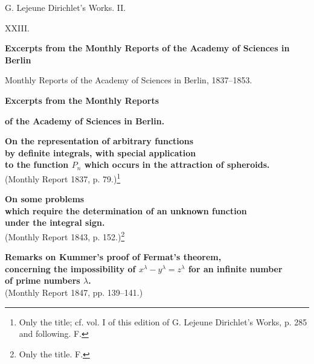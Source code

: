 \documentclass[11pt]{article}
\begin{document}
\begin{center}
{\Large G. Lejeune Dirichlet's Works. II.}\par\vspace{1.2em}
{\Large XXIII.}\par\vspace{0.5em}
{\LARGE \textbf{Excerpts from the Monthly Reports of the Academy of Sciences in Berlin}}\par\vspace{1em}
{\small Monthly Reports of the Academy of Sciences in Berlin, 1837--1853.}
\end{center}

\bigskip
\begin{center}
{\Large \textbf{Excerpts from the Monthly Reports}}\par
{\Large \textbf{of the Academy of Sciences in Berlin.}}
\end{center}

\bigskip
\begin{center}
{\large \textbf{On the representation of arbitrary functions}}\\
{\large \textbf{by definite integrals, with special application}}\\
{\large \textbf{to the function $P_n$ which occurs in the attraction of spheroids.}}\\
{\small (Monthly Report 1837, p. 79.)\footnote{Only the title; cf. vol. I of this edition of G. Lejeune Dirichlet's Works, p. 285 and following. \textnormal{F.}}}
\end{center}

\vspace{2em}
\begin{center}
{\large \textbf{On some problems}}\\
{\large \textbf{which require the determination of an unknown function}}\\
{\large \textbf{under the integral sign.}}\\
{\small (Monthly Report 1843, p. 152.)\footnote{Only the title. \textnormal{F.}}}
\end{center}

\newpage
\begin{center}
{\large \textbf{Remarks on Kummer's proof of Fermat's theorem,}}\\
{\large \textbf{concerning the impossibility of $x^\lambda-y^\lambda=z^\lambda$ for an infinite number}}\\
{\large \textbf{of prime numbers $\lambda$.}}\\
{\small (Monthly Report 1847, pp. 139--141.)}
\end{center}
\end{document}
